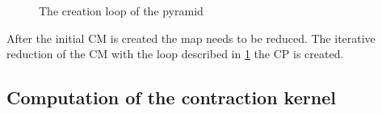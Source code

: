 \documentclass[12pt]{article}
\begin{document}
\begin{figure}[tb]
\centering
{}
\caption{The creation loop of the pyramid}%
\label{fig:creation loop}
\end{figure}

After the initial CM is created the map needs to be reduced. The iterative reduction of the CM with the loop described in \cref{fig:creation loop} the CP is created.

\subsection{Computation of the contraction kernel}%
\label{sub:compute_the_contraction_kernel}
\end{document}

